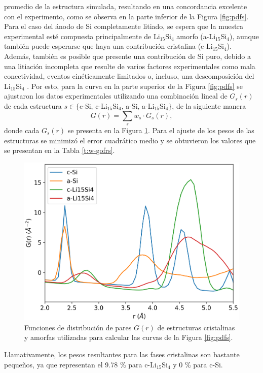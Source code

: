 promedio de la estructura simulada, resultando en una concordancia excelente con 
el experimento, como se observa en la parte inferior de la Figura \ref{fig:pdfs}.
Para el caso del ánodo de Si completamente litiado, se espera que la muestra 
experimental esté compuesta principalmente de Li$_{15}$Si$_4$ amorfo 
(a-Li$_{15}$Si$_4$), aunque también puede esperarse que haya una contribución 
cristalina (c-Li$_{15}$Si$_4$). Además, también es posible que presente una 
contribución de Si puro, debido a una litiación incompleta que resulte de varios 
factores experimentales como mala conectividad, eventos cinéticamente limitados 
o, incluso, una descomposición del Li$_{15}$Si$_4$ \cite{key2009, key2011}. Por 
esto, para la curva en la parte superior de la Figura \ref{fig:pdfs} se 
ajustaron los datos experimentales utilizando una combinación lineal de $G_s(r)$ 
de cada estructura $s \in \lbrace$c-Si, c-Li$_{15}$Si$_4$, a-Si,
a-Li$_{15}$Si$_4\rbrace$, de la siguiente manera 
\begin{equation}\label{eq:contributions}
    G(r) = \sum_s w_s \cdot G_s(r),
\end{equation}
donde cada $G_s(r)$ se presenta en la Figura \ref{fig:gofrs}. Para el 
ajuste de los pesos de las estructuras se minimizó el error cuadrático 
medio y se obtuvieron los valores que se presentan en la Tabla 
\ref{t:w-gofrs}.
\begin{figure}[h!]
    \centering
    \includegraphics[width=.7\textwidth]{Silicio/prediccion/resultados/xray/gofrs.png}
    \caption{Funciones de distribución de pares $G(r)$ de estructuras 
    cristalinas y amorfas utilizadas para calcular las curvas de la Figura 
    \ref{fig:pdfs}.}
    \label{fig:gofrs}
\end{figure}
Llamativamente, los pesos resultantes para las fases cristalinas son bastante 
pequeños, ya que representan el 9.78 \% para c-Li$_{15}$Si$_4$ y 0 \% para c-Si.
